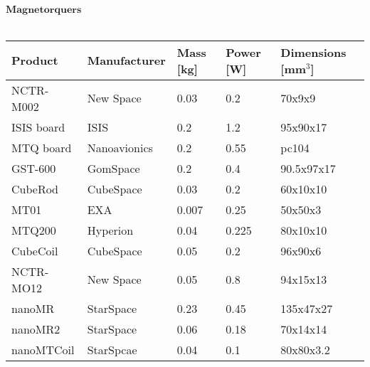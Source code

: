 		      	      $\textbf{Magnetorquers}$\\ \\
		      	      \begin{tabular}{p{3cm}p{3cm}p{2cm}p{2cm}p{2cm}} \toprule
		      	      	Product & Manufacturer & Mass [kg] & Power [W]& Dimensions [mm$^{3}$]\\ \midrule
		      	      	
		      	      NCTR-M002 & New Space & 0.03 & 0.2 & 70x9x9\\
		      	      ISIS board & ISIS & 0.2 & 1.2 & 95x90x17\\
		      	      MTQ board & Nanoavionics & 0.2 & 0.55 & pc104 \\
		      	      GST-600 & GomSpace & 0.2 & 0.4 & 90.5x97x17\\
		      	      CubeRod & CubeSpace & 0.03 &  0.2 & 60x10x10\\
		      	      MT01 & EXA & 0.007 & 0.25 & 50x50x3\\ 
		      	      MTQ200 & Hyperion & 0.04 & 0.225 & 80x10x10\\ 
		      	      CubeCoil  & CubeSpace & 0.05 & 0.2 & 96x90x6\\
		      	      NCTR-MO12 & New Space & 0.05 & 0.8 & 94x15x13\\
		      	      nanoMR & StarSpace & 0.23 & 0.45 & 135x47x27\\
		      	      nanoMR2 & StarSpace & 0.06 & 0.18 & 70x14x14\\ 
		      	      nanoMTCoil & StarSpcae & 0.04 & 0.1 & 80x80x3.2\\ \bottomrule
		      	      \end{tabular}\\ \\ \\ \\ \\ \\ 
		      	      
		      	      
		      	      
